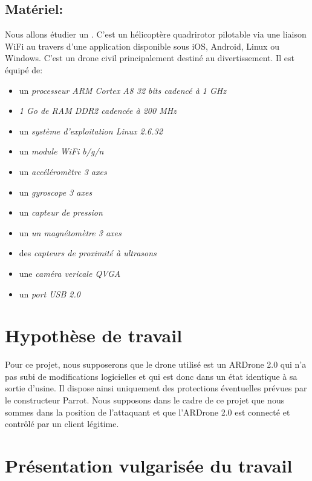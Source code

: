 \documentclass[a4paper,12pt]{report}
\begin{document}
\subsection{Matériel: }
Nous allons étudier un . C'est un hélicoptère quadrirotor pilotable via une liaison WiFi au travers d'une application disponible sous iOS, Android, Linux ou Windows. C'est un drone civil principalement destiné au divertissement. Il est équipé de:
\medbreak
\begin{itemize}
    \item un \textit{processeur ARM Cortex A8 32 bits cadencé à 1 GHz}
    \item \textit{1 Go de RAM DDR2 cadencée à 200 MHz}
    \item un \textit{système d'exploitation Linux 2.6.32}
    \item un \textit{module WiFi b/g/n}
    \item un \textit{accéléromètre 3 axes}
    \item un \textit{gyroscope 3 axes}
    \item un \textit{capteur de pression}
    \item un \textit{un magnétomètre 3 axes}
    \item des \textit{capteurs de proximité à ultrasons}
    \item une \textit{caméra vericale QVGA}
    \item un \textit{port USB 2.0}
\end{itemize}


\section{Hypothèse de travail}
Pour ce projet, nous supposerons que le drone utilisé est un ARDrone 2.0 qui n'a pas subi de modifications logicielles et qui est donc dans un état identique à sa sortie d'usine. Il dispose ainsi uniquement des protections éventuelles prévues par le constructeur Parrot. Nous supposons dans le cadre de ce projet que nous sommes  dans la position de l'attaquant et que l'ARDrone 2.0 est connecté et contrôlé par un client légitime.


\section{Présentation vulgarisée du travail}
\end{document}
